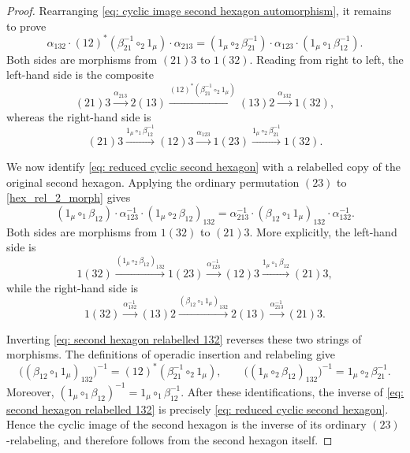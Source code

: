 \documentclass{amsart}
\theoremstyle{definition}
\numberwithin{equation}{section}
\begin{document}
\begin{proof}
Rearranging \eqref{eq: cyclic image second hexagon automorphism}, it remains to prove
\begin{equation}
\label{eq: reduced cyclic second hexagon} 
\alpha_{132}\cdot(12)^*(\beta_{21}^{-1}\circ_2 1_\mu) \cdot\alpha_{213} = (1_\mu\circ_2\beta_{21}^{-1}) \cdot\alpha_{123} \cdot(1_\mu\circ_1\beta_{12}^{-1}).
\end{equation}
Both sides are morphisms from $(21)3$ to $1(32)$. Reading from right to left, the left-hand side is the composite
\begin{equation}
\label{eq: reduced cyclic second hexagon left string}
(21)3\xrightarrow{\alpha_{213}}2(13)\xrightarrow{(12)^*(\beta_{21}^{-1}\circ_2 1_\mu)}(13)2\xrightarrow{\alpha_{132}} 1(32),
\end{equation}
whereas the right-hand side is
\begin{equation}
\label{eq: reduced cyclic second hexagon right string}
(21)3\xrightarrow{1_\mu\circ_1\beta_{12}^{-1}}(12)3\xrightarrow{\alpha_{123}}1(23)\xrightarrow{1_\mu\circ_2\beta_{21}^{-1}}1(32).
\end{equation}

We now identify
\eqref{eq: reduced cyclic second hexagon} with a relabelled copy of
the original second hexagon. Applying the ordinary permutation
$(23)$ to \eqref{hex_rel_2_morph} gives
\begin{equation}
\label{eq: second hexagon relabelled 132}
(1_\mu\circ_1\beta_{12}) \cdot\alpha_{123}^{-1} \cdot(1_\mu\circ_2\beta_{12})_{132} =
\alpha_{213}^{-1} \cdot(\beta_{12}\circ_1 1_\mu)_{132} \cdot\alpha_{132}^{-1}.
\end{equation}
Both sides are morphisms from $1(32)$ to $(21)3$. More explicitly,
the left-hand side is
\begin{equation}
\label{eq: relabelled second hexagon left string}
1(32)\xrightarrow{(1_\mu\circ_2\beta_{12})_{132}}1(23)\xrightarrow{\alpha_{123}^{-1}}(12)3\xrightarrow{1_\mu\circ_1\beta_{12}}(21)3,
\end{equation}
while the right-hand side is
\begin{equation}
\label{eq: relabelled second hexagon right string}
1(32)\xrightarrow{\alpha_{132}^{-1}}(13)2\xrightarrow{(\beta_{12}\circ_1 1_\mu)_{132}}2(13)\xrightarrow{\alpha_{213}^{-1}}(21)3.
\end{equation}

Inverting \eqref{eq: second hexagon relabelled 132} reverses these
two strings of morphisms. The definitions of operadic insertion and
relabeling give
\begin{equation}
\label{eq: inverse relabelled braid identifications}
\bigl((\beta_{12}\circ_1 1_\mu)_{132}\bigr)^{-1} =
(12)^*(\beta_{21}^{-1}\circ_2 1_\mu),
\qquad
\bigl((1_\mu\circ_2\beta_{12})_{132}\bigr)^{-1} = 1_\mu\circ_2\beta_{21}^{-1}.
\end{equation}
Moreover, $(1_\mu\circ_1\beta_{12})^{-1} =1_\mu\circ_1\beta_{12}^{-1}$. After these identifications, the inverse of \eqref{eq: second hexagon relabelled 132} is precisely \eqref{eq: reduced cyclic second hexagon}. Hence the cyclic image of the second hexagon is the inverse of its ordinary $(23)$-relabeling, and therefore follows from the second hexagon itself.


\end{proof}
\end{document}
